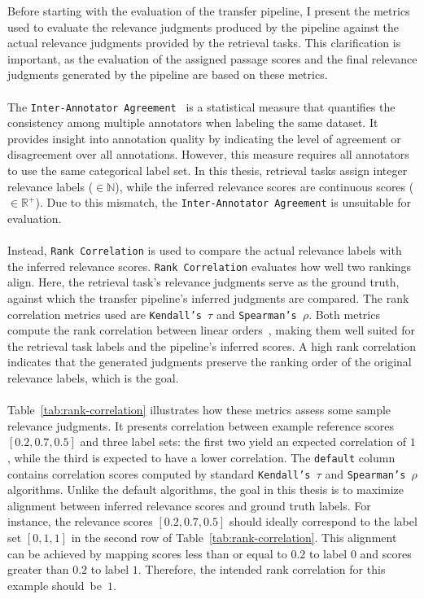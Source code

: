 Before starting with the evaluation of the transfer pipeline, I present the metrics used to evaluate the relevance judgments produced by the pipeline against the actual relevance judgments provided by the retrieval tasks. This clarification is important, as the evaluation of the assigned passage scores and the final relevance judgments generated by the pipeline are based on these metrics.
\\\\
The \texttt{Inter-Annotator Agreement}~\cite{artstein:2017} is a statistical measure that quantifies the consistency among multiple annotators when labeling the same dataset. It provides insight into annotation quality by indicating the level of agreement or disagreement over all annotations. However, this measure requires all annotators to use the same categorical label set. In this thesis, retrieval tasks assign integer relevance labels ($\in \mathbb{N}$), while the inferred relevance scores are continuous scores ($\in \mathbb{R}^{+}$). Due to this mismatch, the \mbox{\texttt{Inter-Annotator Agreement}} is unsuitable for evaluation.
\\\\
Instead, \texttt{Rank Correlation} is used to compare the actual relevance labels with the inferred relevance scores. \texttt{Rank Correlation} evaluates how well two rankings align. Here, the retrieval task's relevance judgments serve as the ground truth, against which the transfer pipeline's inferred judgments are compared. The rank correlation metrics used are \texttt{Kendall's $\tau$} and \texttt{Spearman's $\rho$}. Both metrics compute the rank correlation between linear orders~\cite{monjardet:1998}, making them well suited for the retrieval task labels and the pipeline's inferred scores. A high rank correlation indicates that the generated judgments preserve the ranking order of the original relevance labels, which is the goal.
\\\\
Table~\ref{tab:rank-correlation} illustrates how these metrics assess some sample relevance judgments. It presents correlation between example reference scores $[0.2, 0.7, 0.5]$ and three label sets: the first two yield an expected correlation of $1$, while the third is expected to have a lower correlation. The \texttt{default} column contains correlation scores computed by standard \texttt{Kendall's $\tau$} and \texttt{Spearman's $\rho$} algorithms. Unlike the default algorithms, the goal in this thesis is to maximize alignment between inferred relevance scores and ground truth labels. For instance, the relevance scores $[0.2, 0.7, 0.5]$ should ideally correspond to the label set $[0, 1, 1]$ in the second row of Table~\ref{tab:rank-correlation}. This alignment can be achieved by mapping scores less than or equal to $0.2$ to label $0$ and scores greater than $0.2$ to label $1$. Therefore, the intended rank correlation for this example \mbox{should be $1$.}
